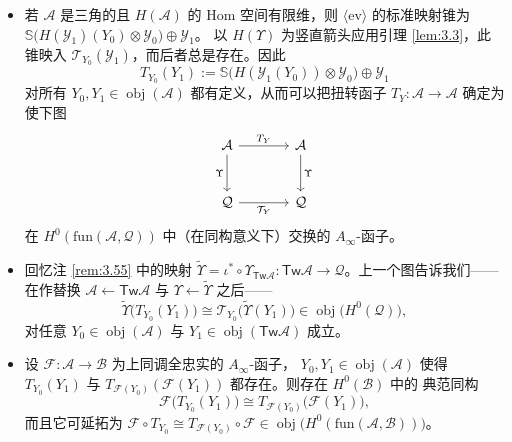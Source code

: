 \begin{Rem}\label{rem:4.22}
\begin{itemize}
  \item 若 $\mathcal A$ 是三角的且 $H(\mathcal A)$ 的 Hom 空间有限维，则
        $\langle\mathrm{ev}\rangle$ 的标准映射锥为
        $\mathbb S\bigl(H(\mathcal Y_1)(Y_0)\otimes\mathcal Y_0\bigr)\oplus\mathcal Y_1$。
        以 $H(\Upsilon)$ 为竖直箭头应用引理 \ref{lem:3.3}，此锥映入
        $\mathcal T_{Y_0}(\mathcal Y_1)$，而后者总是存在。因此
        \[
          T_{Y_0}(Y_1):=\mathbb S\bigl(H(\mathcal Y_1(Y_0))\otimes\mathcal Y_0\bigr)
          \oplus\mathcal Y_1
        \]
        对所有 $Y_0,Y_1\in\operatorname{obj}(\mathcal A)$ 都有定义，从而可以把扭转函子
        $T_Y:\mathcal A\to\mathcal A$ 确定为使下图
        \[
          \begin{tikzcd}[row sep=large, column sep=large]
            \mathcal A \arrow[r, "T_Y"] \arrow[d, "\Upsilon"']
              & \mathcal A \arrow[d, "\Upsilon"] \\
            \mathcal Q \arrow[r, "\mathcal T_Y"']
              & \mathcal Q
          \end{tikzcd}
        \]
        在 $H^0(\mathrm{fun}(\mathcal A,\mathcal Q))$ 中（在同构意义下）交换的
        $A_\infty$-函子。
  \item 回忆注 \ref{rem:3.55} 中的映射
        $\widetilde\Upsilon=\iota^*\circ\Upsilon_{\mathsf{Tw}\mathcal A}:
        \mathsf{Tw}\mathcal A\to\mathcal Q$。上一个图告诉我们——在作替换
        $\mathcal A\leftarrow\mathsf{Tw}\mathcal A$ 与
        $\Upsilon\leftarrow\widetilde\Upsilon$ 之后——
        \[
          \widetilde\Upsilon\bigl(T_{Y_0}(Y_1)\bigr)
          \cong\mathcal T_{Y_0}\bigl(\widetilde\Upsilon(Y_1)\bigr)
          \in\operatorname{obj}\bigl(H^0(\mathcal Q)\bigr),
        \]
        对任意 $Y_0\in\operatorname{obj}(\mathcal A)$ 与
        $Y_1\in\operatorname{obj}(\mathsf{Tw}\mathcal A)$ 成立。
  \item 设 $\mathcal F:\mathcal A\to\mathcal B$ 为上同调全忠实的 $A_\infty$-函子，
        $Y_0,Y_1\in\operatorname{obj}(\mathcal A)$ 使得 $T_{Y_0}(Y_1)$ 与
        $T_{\mathcal F(Y_0)}(\mathcal F(Y_1))$ 都存在。则存在 $H^0(\mathcal B)$ 中的
        典范同构
        \[
          \mathcal F\bigl(T_{Y_0}(Y_1)\bigr)
          \cong T_{\mathcal F(Y_0)}\bigl(\mathcal F(Y_1)\bigr),
        \]
        而且它可延拓为
        $\mathcal F\circ T_{Y_0}\cong T_{\mathcal F(Y_0)}\circ\mathcal F
        \in\operatorname{obj}\bigl(H^0(\mathrm{fun}(\mathcal A,\mathcal B))\bigr)$。
\end{itemize}
\end{Rem}

